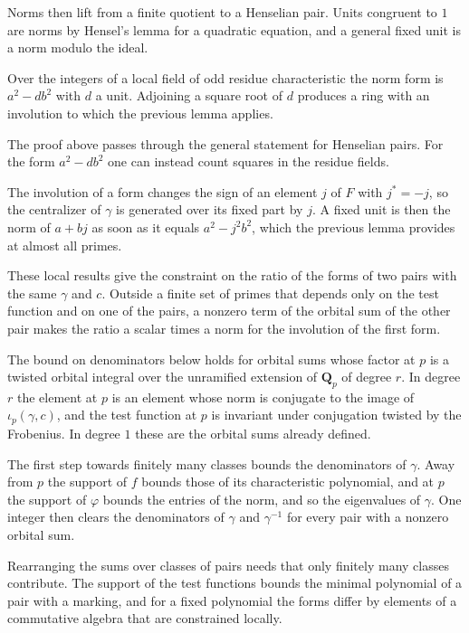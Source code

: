 Norms then lift from a finite quotient to a Henselian pair. Units congruent to $1$ are norms by Hensel's
lemma for a quadratic equation, and a general fixed unit is a norm modulo the ideal.

Over the integers of a local field of odd residue characteristic the norm form is $a^2-db^2$ with $d$ a
unit. Adjoining a square root of $d$ produces a ring with an involution to which the previous lemma
applies.

The proof above passes through the general statement for Henselian pairs. For the form $a^2-db^2$ one
can instead count squares in the residue fields.

The involution of a form changes the sign of an element $j$ of $F$ with $j^*=-j$, so the centralizer of
$\gamma$ is generated over its fixed part by $j$. A fixed unit is then the norm of $a+bj$ as soon as it
equals $a^2-j^2b^2$, which the previous lemma provides at almost all primes.

These local results give the constraint on the ratio of the forms of two pairs with the same $\gamma$
and $c$. Outside a finite set of primes that depends only on the test function and on one of the pairs,
a nonzero term of the orbital sum of the other pair makes the ratio a scalar times a norm for the
involution of the first form.

The bound on denominators below holds for orbital sums whose factor at $p$ is a twisted orbital integral
over the unramified extension of $\mathbf Q_p$ of degree $r$. In degree $r$ the element at $p$ is an element
whose norm is conjugate to the image of $\iota_p(\gamma,c)$, and the test function at $p$ is invariant under
conjugation twisted by the Frobenius. In degree $1$ these are the orbital sums already defined.

The first step towards finitely many classes bounds the denominators of $\gamma$. Away from $p$ the
support of $f$ bounds those of its characteristic polynomial, and at $p$ the support of $\varphi$ bounds the
entries of the norm, and so the eigenvalues of $\gamma$. One integer then clears the denominators of
$\gamma$ and $\gamma^{-1}$ for every pair with a nonzero orbital sum.

Rearranging the sums over classes of pairs needs that only finitely many classes contribute. The
support of the test functions bounds the minimal polynomial of a pair with a marking, and for a fixed
polynomial the forms differ by elements of a commutative algebra that are constrained locally.

